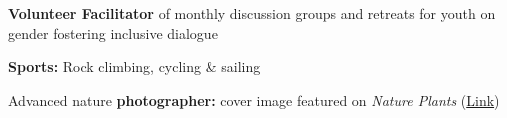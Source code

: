 \documentclass[a4paper,10pt]{article}
\begin{document}
\begin{description}
  \raggedright
  \item \textbf{Volunteer Facilitator} of monthly discussion groups and retreats for youth on gender fostering inclusive dialogue
  \item \textbf{Sports:} Rock climbing, cycling \& sailing
  \item Advanced nature \textbf{photographer:} cover image featured on \emph{Nature Plants} (\href{https://lauralwd.github.io/photography/}{Link})
\end{description}
\end{document}
